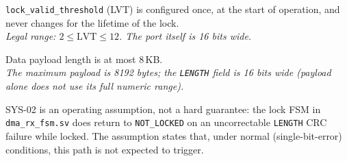 \documentclass[11pt,a4paper]{article}
\begin{document}
\begin{sysBox}
\texttt{lock\_valid\_threshold} (LVT) is configured once, at the start of
operation, and never changes for the lifetime of the lock.\\
\textit{Legal range: $2 \le \text{LVT} \le 12$. The port itself is 16 bits wide.}
\end{sysBox}

\begin{sysBox}
Data payload length is at most 8\,KB.\\
\textit{The maximum payload is 8192 bytes; the \texttt{LENGTH} field is 16
bits wide (payload alone does not use its full numeric range).}
\end{sysBox}

\begin{ruleBox}[Note]
SYS-02 is an operating assumption, not a hard guarantee: the lock FSM in
\texttt{dma\_rx\_fsm.sv} does return to \texttt{NOT\_LOCKED} on an
uncorrectable \texttt{LENGTH} CRC failure while locked. The assumption
states that, under normal (single-bit-error) conditions, this path is not
expected to trigger.
\end{ruleBox}
\end{document}
